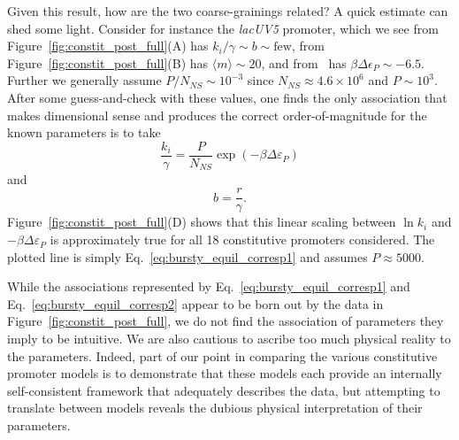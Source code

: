 Given this result, how are the two coarse-grainings related? A quick estimate
can shed some light. Consider for instance the \textit{lacUV5} promoter, which
we see from Figure~\ref{fig:constit_post_full}(A) has $k_i/\gamma \sim b \sim
\text{few}$, from Figure~\ref{fig:constit_post_full}(B) has $\langle m \rangle
\sim 20$, and from~\cite{Brewster2012} has $\beta\Delta\epsilon_P \sim - 6.5$.
Further we generally assume $P/N_{NS} \sim 10^{-3}$ since
$N_{NS}\approx4.6\times10^6$ and $P\sim10^3$. After some guess-and-check with
these values, one finds the only association that makes dimensional sense and
produces the correct order-of-magnitude for the known parameters is to take
\begin{equation}
\frac{k_i}{\gamma} = \frac{P}{N_{NS}} \exp(-\beta\Delta\varepsilon_P)
\label{eq:bursty_equil_corresp1}
\end{equation}
and
\begin{equation}
b = \frac{r}{\gamma}.
\label{eq:bursty_equil_corresp2}
\end{equation}
Figure~\ref{fig:constit_post_full}(D) shows that this linear scaling between
$\ln k_i$ and $-\beta\Delta\varepsilon_P$ is approximately true for all 18
constitutive promoters considered. The plotted line is simply
Eq.~\ref{eq:bursty_equil_corresp1} and assumes $P\approx 5000$.

While the associations represented by Eq.~\ref{eq:bursty_equil_corresp1} and
Eq.~\ref{eq:bursty_equil_corresp2} appear to be born out by the data in
Figure~\ref{fig:constit_post_full}, we do not find the association of parameters
they imply to be intuitive. We are also cautious to ascribe too much physical
reality to the parameters. Indeed, part of our point in comparing the various
constitutive promoter models is to demonstrate that these models each provide an
internally self-consistent framework that adequately describes the data, but
attempting to translate between models reveals the dubious physical
interpretation of their parameters.


